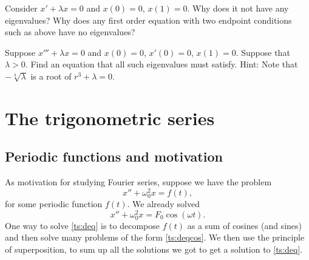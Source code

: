 \documentclass[12pt]{book}
\begin{document}
\begin{exercise}
Consider
$x' + \lambda x = 0$ and $x(0)=0$, $x(1) = 0$.  Why does it not
have any eigenvalues?  Why does any first order equation with two endpoint
conditions such as above have no eigenvalues?
\end{exercise}

\begin{exercise}[challenging]
Suppose $x''' + \lambda x = 0$ and $x(0)=0$, $x'(0) = 0$, $x(1) = 0$.
Suppose that $\lambda > 0$.  Find an equation that all such
eigenvalues must satisfy.
Hint: Note that $-\sqrt[3]{\lambda}$ is a root
of $r^3+\lambda = 0$.
\end{exercise}


\sectionnewpage
\section{The trigonometric series} \label{ts:section}


\subsection{Periodic functions and motivation}

As motivation for studying Fourier series, suppose we have the problem
\begin{equation} \label{ts:deq}
x'' + \omega_0^2 x = f(t) ,
\end{equation}
for some periodic function $f(t)$.
We already solved
\begin{equation} \label{ts:deqcos}
x'' + \omega_0^2 x = F_0 \cos ( \omega t) .
\end{equation}
One way to solve \eqref{ts:deq} is to
decompose $f(t)$ as a sum of cosines (and sines) and then
solve many problems of the form \eqref{ts:deqcos}.  We then use
the principle of superposition, to sum up all the solutions we got
to get a solution to \eqref{ts:deq}.
\end{document}
